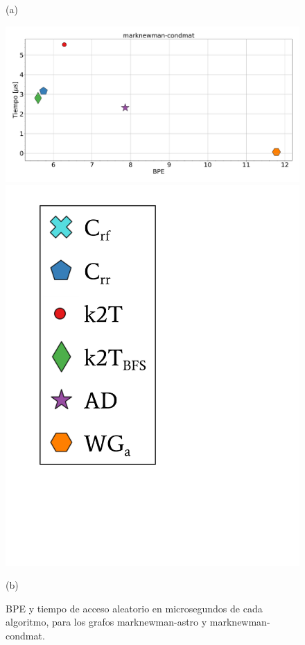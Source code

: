 \begin{figure}
\begin{minipage}{1\textwidth}
    			(a)		
    	\end{minipage}
    	
       	\begin{minipage}{1\textwidth}
    			\centering
    			\begin{minipage}{0.8\textwidth}
    				\centering
    				\includegraphics[width=1\linewidth]{img/bpeTimes/aleatorio/marknewman-condmat.pdf}
    			\end{minipage}
    			\begin{minipage}{0.15\textwidth}
    				\centering
    				\includegraphics[scale=.24, clip, trim=70 200 300 40]{img/bpeTimes/labelAle.pdf}
    			\end{minipage}
    			
    			(b)		
    	\end{minipage}
    	
    \caption{BPE y tiempo de acceso aleatorio en microsegundos de cada algoritmo, para los grafos marknewman-astro y marknewman-condmat.}
    \label{fig:bpetAle1}
\end{figure}
